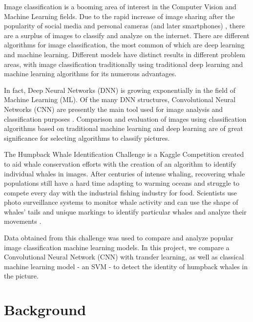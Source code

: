 \documentclass[paper=a4, fontsize=11pt]{scrartcl}
\numberwithin{equation}{section}		%
\numberwithin{table}{section}				%
\begin{document}
Image classification is a booming area of interest in the Computer Vision and Machine Learning fields. Due to the rapid increase of image sharing after the popularity of social media and personal cameras (and later smartphones) \cite{jain2000statistical}, there are a surplus of images to classify and analyze on the internet. There are different algorithms for image classification, the most common of which are deep learning and machine learning. Different models have distinct results in different problem areas, with image classification traditionally using traditional deep learning and machine learning algorithms for its numerous advantages. 

In fact, Deep Neural Networks (DNN) is growing exponentially in the field of Machine Learning (ML). Of the many DNN structures, Convolutional Neural Networks (CNN) are presently the main tool used for image analysis and classification purposes \cite{jain2000statistical}. Comparison and evaluation of images using classification algorithms based on traditional machine learning and deep learning are of great significance for selecting algorithms to classify pictures. 

The Humpback Whale Identification Challenge is a Kaggle Competition \cite{WhateIdentifcationChallengeKaggle} created to aid whale conservation efforts with the creation of an algorithm to identify individual whales in images. After centuries of intense whaling, recovering whale populations still have a hard time adapting to warming oceans and struggle to compete every day with the industrial fishing industry for food. Scientists use photo surveillance systems to monitor whale activity and can use the shape of whales’ tails and unique markings to identify particular whales and analyze their movements \cite{JaisakthiS.M.2017Awms}.

Data obtained from this challenge was used to compare and analyze popular image classification machine learning models. In this project, we compare a Convolutional Neural Network (CNN) with transfer learning, as well as classical machine learning model - an SVM - to detect the identity of humpback whales in the picture.


\section{Background}\label{sec: background}
\end{document}
